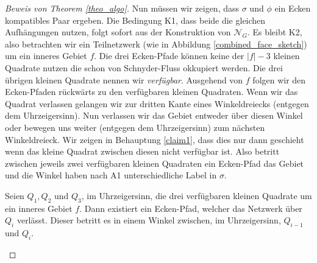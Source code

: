 \begin{proof}[Beweis von Theorem \ref{theo_algo}]
Nun müssen wir zeigen, dass $\sigma$ und $\phi$ ein Ecken kompatibles Paar ergeben. Die Bedingung K1, dass beide die gleichen Aufhängungen nutzen, folgt sofort aus der Konstruktion von $\mathcal{N}_G$. Es bleibt K2, also betrachten wir ein Teilnetzwerk (wie in Abbildung \ref{combined_face_sketch}) um ein inneres Gebiet $f$. Die drei Ecken-Pfade können keine der $|f|-3$ kleinen Quadrate nutzen die schon von Schnyder-Fluss okkupiert werden. Die drei übrigen kleinen Quadrate nennen wir \textit{verfügbar}. Ausgehend von $f$ folgen wir den Ecken-Pfaden rückwärts zu den verfügbaren kleinen Quadraten. Wenn wir das Quadrat verlassen gelangen wir zur dritten Kante eines Winkeldreiecks (entgegen dem Uhrzeigersinn). Nun verlassen wir das Gebiet entweder über diesen Winkel oder bewegen uns weiter (entgegen dem Uhrzeigersinn) zum nächsten Winkeldreieck. Wir zeigen in Behauptung \ref{claim1}, dass dies nur dann geschieht wenn das kleine Quadrat zwischen diesen nicht verfügbar ist. Also betritt zwischen jeweils zwei verfügbaren kleinen Quadraten ein Ecken-Pfad das Gebiet und die Winkel haben nach A1 unterschiedliche Label in $\sigma$.

\begin{claim}\label{claim1}
Seien $Q_1,Q_2$ und $Q_3$, im Uhrzeigersinn, die drei verfügbaren kleinen Quadrate um ein inneres Gebiet $f$. Dann existiert ein Ecken-Pfad, welcher das Netzwerk über $Q_i$ verlässt. Dieser betritt es in einem Winkel zwischen, im Uhrzeigersinn, $Q_{i-1}$ und $Q_i$.
\end{claim}


\end{proof}
